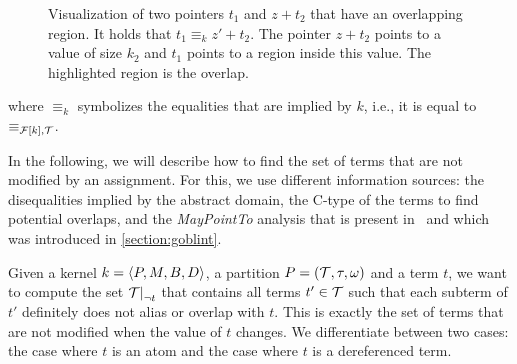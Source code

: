 \begin{figure}
	\centering

	\caption[Another possibility of two pointers $t_1$ and $z+ t_2$ that have an overlapping region.]{Visualization of two pointers $t_1$ and $z+ t_2$ that have an overlapping region.
	It holds that $t_1 \equiv_{k} z' + t_2$.
	The pointer $z+ t_2$ points to a value of size $k_2$ and
	$t_1$ points to a region inside this value.
	The highlighted region is the overlap.}\label{fig:overlap1}
	\end{figure}


where $\equiv_{k}$ symbolizes the equalities that are implied by $k$, i.e.,
it is equal to $\equiv_{\mathcal{F}[k],\mathcal{T}}$.

In the following, we will describe how to find the set of terms
that are not modified by an assignment.
For this, we use different information sources: the disequalities implied by the abstract domain, the C-type of the terms to find potential overlaps, and the \emph{MayPointTo} analysis that is present in \goblint\ and which was introduced in \cref{section:goblint}.

Given a kernel $k = \langle P, M, B, D\rangle$, a partition $P = (\mathcal{T}, \tau, \omega)$ and a term $t$,
we want to compute the set $\restr{\T}{\neg t}$ that contains all terms $t' \in \mathcal{T}$ such that each subterm of $t'$ definitely does not alias or overlap with $t$.
This is exactly the set of terms that are not modified when the value of $t$ changes.
We differentiate between two cases: the case where $t$ is an atom and the case where $t$ is a dereferenced term.

